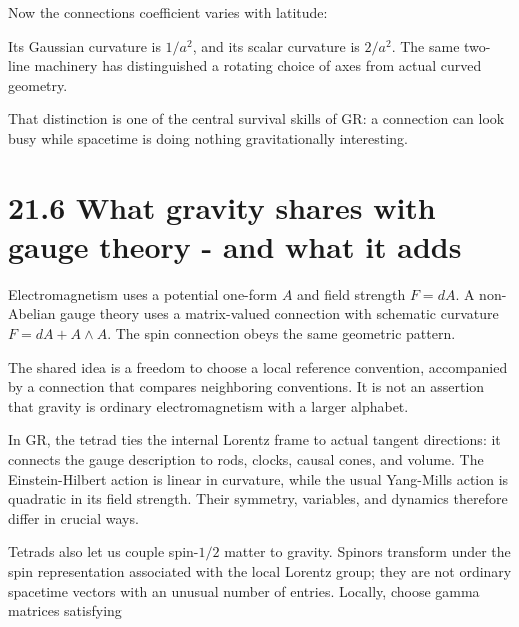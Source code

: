 \documentclass[
  11pt,
  letterpaper,
  oneside,
  openany]{scrbook}
\begin{document}
Now the connection\textquotesingle s coefficient varies with latitude:

\begin{center}
\begingroup
{}
\ifdim\wd\grmathbox>\linewidth
\resizebox{\linewidth}{!}{\usebox{\grmathbox}}
\else\usebox{\grmathbox}\fi
\endgroup
\end{center}

Its Gaussian curvature is \(1/a^2\), and its scalar curvature is
\(2/a^2\). The same two-line machinery has distinguished a rotating
choice of axes from actual curved geometry.

That distinction is one of the central survival skills of GR: a
connection can look busy while spacetime is doing nothing
gravitationally interesting.

\hypertarget{what-gravity-shares-with-gauge-theory---and-what-it-adds}{%
\section{21.6 What gravity shares with gauge theory - and what it
adds}\label{what-gravity-shares-with-gauge-theory---and-what-it-adds}}

Electromagnetism uses a potential one-form \(A\) and field strength
\(F=dA\). A non-Abelian gauge theory uses a matrix-valued connection
with schematic curvature \(F=dA+A\wedge A\). The spin connection obeys
the same geometric pattern.

The shared idea is a freedom to choose a local reference convention,
accompanied by a connection that compares neighboring conventions. It is
not an assertion that gravity is ordinary electromagnetism with a larger
alphabet.

In GR, the tetrad ties the internal Lorentz frame to actual tangent
directions: it connects the gauge description to rods, clocks, causal
cones, and volume. The Einstein-Hilbert action is linear in curvature,
while the usual Yang-Mills action is quadratic in its field strength.
Their symmetry, variables, and dynamics therefore differ in crucial
ways.

Tetrads also let us couple spin-\(1/2\) matter to gravity. Spinors
transform under the spin representation associated with the local
Lorentz group; they are not ordinary spacetime vectors with an unusual
number of entries. Locally, choose gamma matrices satisfying
\end{document}
